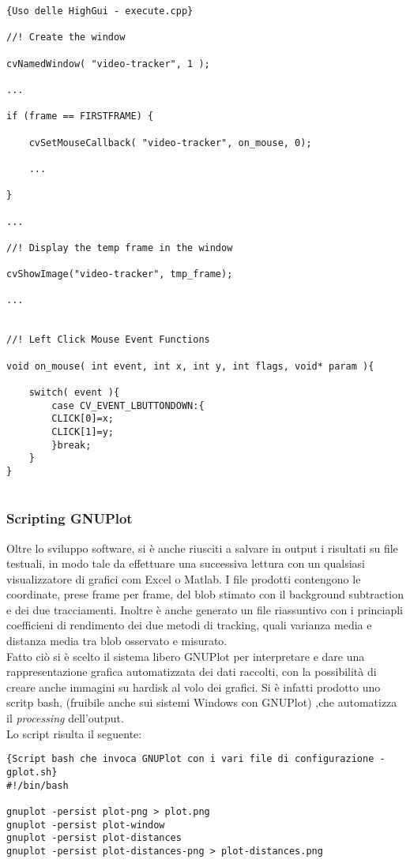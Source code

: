 \lstset{language=c++}
\lstset{commentstyle=\emph}
\begin{lstlisting}[frame=r,caption=Uso delle HighGui - execute.cpp ,breaklines=true,basicstyle=\small]{Uso delle HighGui - execute.cpp}

//! Create the window

cvNamedWindow( "video-tracker", 1 );

...

if (frame == FIRSTFRAME) {

	cvSetMouseCallback( "video-tracker", on_mouse, 0);
	
	...

}

...

//! Display the temp frame in the window

cvShowImage("video-tracker", tmp_frame);

...


//! Left Click Mouse Event Functions

void on_mouse( int event, int x, int y, int flags, void* param ){
 
	switch( event ){
		case CV_EVENT_LBUTTONDOWN:{
		CLICK[0]=x;
		CLICK[1]=y;
		}break;
	}
}


\end{lstlisting}
\newpage
\subsubsection{Scripting GNUPlot}
Oltre lo sviluppo software, si è anche riusciti a salvare in output i risultati su file testuali, in modo tale da effettuare una successiva lettura con un qualsiasi visualizzatore di grafici com Excel o Matlab. I file prodotti contengono le coordinate, prese frame per frame, del blob stimato con il background subtraction e dei due tracciamenti. Inoltre è anche generato un file riassuntivo con i princiapli coefficieni di rendimento dei due metodi di tracking, quali varianza media e distanza media tra blob osservato e misurato.\\
Fatto ciò si è scelto il sistema libero GNUPlot per interpretare e dare una rappresentazione grafica automatizzata dei dati raccolti, con la possibilità di creare anche immagini su hardisk al volo dei grafici. Si è infatti prodotto uno scritp bash, (fruibile anche sui sistemi Windows con GNUPlot) ,che automatizza il \textit{processing} dell'output.\\
Lo script risulta il seguente:

\lstset{language=bash}
\lstset{commentstyle=\emph}
\begin{lstlisting}[frame=r,caption=Script bash che invoca GNUPlot con i vari file di configurazione - gplot.sh ,breaklines=true,basicstyle=\small]{Script bash che invoca GNUPlot con i vari file di configurazione - gplot.sh}
#!/bin/bash

gnuplot -persist plot-png > plot.png
gnuplot -persist plot-window 
gnuplot -persist plot-distances
gnuplot -persist plot-distances-png > plot-distances.png


\end{lstlisting}


